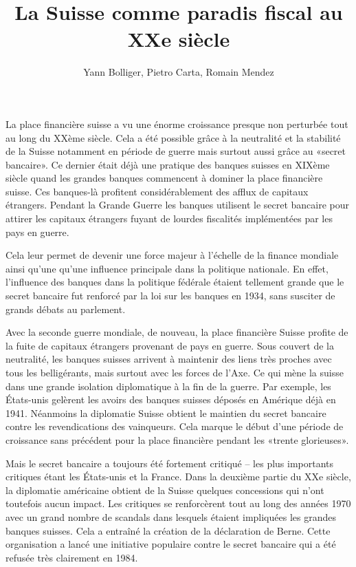 \documentclass[ebook,9pt,oneside,openany]{memoir}
\title{La Suisse comme paradis fiscal au XXe siècle}
\author{Yann Bolliger, Pietro Carta, Romain Mendez}
\begin{document}
\maketitle

La place financière suisse a vu une énorme croissance presque non perturbée tout au long du XXème siècle. Cela a été possible grâce à la neutralité et la stabilité de la Suisse notamment en période de guerre mais surtout aussi grâce au «secret bancaire». Ce dernier était déjà une pratique des banques suisses en XIXème siècle quand les grandes banques commencent à dominer la place financière suisse. Ces banques-là profitent considérablement des afflux de capitaux étrangers. Pendant la Grande Guerre les banques utilisent le secret bancaire pour attirer les capitaux étrangers fuyant de lourdes fiscalités implémentées par les pays en guerre.

Cela leur permet de devenir une force majeur à l’échelle de la finance mondiale ainsi qu’une qu’une influence principale dans la politique nationale.
En effet, l’influence des banques dans la politique fédérale étaient tellement grande que le secret bancaire fut renforcé par la loi sur les banques en 1934, sans susciter de grands débats au parlement. 

Avec la seconde guerre mondiale, de nouveau, la place financière Suisse profite de la fuite de capitaux étrangers provenant de pays en guerre. Sous couvert de la neutralité, les banques suisses arrivent à maintenir des liens très proches avec tous les belligérants, mais surtout avec les forces de l’Axe. Ce qui mène la suisse dans une grande isolation diplomatique à la fin de la guerre. Par exemple, les États-unis gelèrent les avoirs des banques suisses déposés en Amérique déjà en 1941. Néanmoins la diplomatie Suisse obtient le maintien du secret bancaire contre les revendications des vainqueurs. Cela marque le début d’une période de croissance sans précédent pour la place financière pendant les «trente glorieuses».

Mais le secret bancaire a toujours été fortement critiqué – les plus importants critiques étant les États-unis et la France. Dans la deuxième partie du XXe siècle, la diplomatie américaine obtient de la Suisse quelques concessions qui n’ont toutefois aucun impact. Les critiques se renforcèrent tout au long des années 1970 avec un grand nombre de scandals dans lesquels étaient impliquées les grandes banques suisses. Cela a entraîné la création de la déclaration de Berne. Cette organisation a lancé une initiative populaire contre le secret bancaire qui a été refusée très clairement en 1984.
\end{document}
